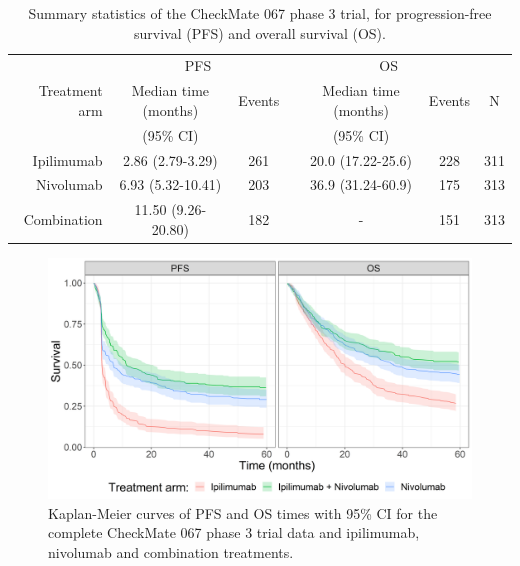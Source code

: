 \documentclass[AMA,STIX1COL]{WileyNJD-v2}
\begin{document}
\begin{center}
\begin{table}[!h]
\caption{Summary statistics of the CheckMate 067 phase 3 trial, for progression-free survival (PFS) and overall survival (OS). \label{tab:checkmate_summary}}
\centering
\begin{tabular}{r c c c c c c}
\toprule
\multicolumn{1}{l}{} & \multicolumn{2}{c}{PFS} & \multicolumn{1}{l}{} &\multicolumn{2}{c}{OS}\\
\cmidrule{2-3}\cmidrule{5-6}
 Treatment arm & Median time (months) & Events & & Median time (months) & Events & N\\
               & (95\% CI)            &        & & (95\% CI)            &        & \\
 \midrule
 Ipilimumab  & 2.86 (2.79-3.29)   & 261 & & 20.0 (17.22-25.6) & 228 & 311\\ 
 Nivolumab   & 6.93 (5.32-10.41)  & 203 & & 36.9 (31.24-60.9) & 175 & 313\\ 
 Combination & 11.50 (9.26-20.80) & 182 & & - & 151 & 313\\ 
\bottomrule
\end{tabular}
\end{table}
\end{center}

\begin{figure}[!HtH]
\centering
\includegraphics[width=0.6\linewidth]{km_raw_data.png}
\caption{\label{fig:S_raw_data} Kaplan-Meier curves of PFS and OS times with 95\% CI for the complete CheckMate 067 phase 3 trial data and ipilimumab, nivolumab and combination treatments.}
\end{figure}

%
\end{document}
